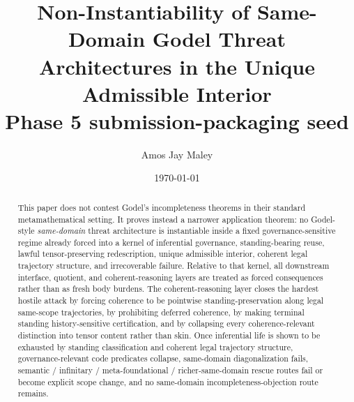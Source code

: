 \documentclass[11pt]{article}
\title{Non-Instantiability of Same-Domain Godel Threat Architectures in the Unique Admissible Interior\\\large Phase 5 submission-packaging seed}
\author{Amos Jay Maley}
\date{\today}
\begin{document}
\maketitle

\begin{abstract}
This paper does not contest Godel's incompleteness theorems in their standard metamathematical setting. It proves instead a narrower application theorem: no Godel-style \emph{same-domain} threat architecture is instantiable inside a fixed governance-sensitive regime already forced into a kernel of inferential governance, standing-bearing reuse, lawful tensor-preserving redescription, unique admissible interior, coherent legal trajectory structure, and irrecoverable failure. Relative to that kernel, all downstream interface, quotient, and coherent-reasoning layers are treated as forced consequences rather than as fresh body burdens. The coherent-reasoning layer closes the hardest hostile attack by forcing coherence to be pointwise standing-preservation along legal same-scope trajectories, by prohibiting deferred coherence, by making terminal standing history-sensitive certification, and by collapsing every coherence-relevant distinction into tensor content rather than skin. Once inferential life is shown to be exhausted by standing classification and coherent legal trajectory structure, governance-relevant code predicates collapse, same-domain diagonalization fails, semantic / infinitary / meta-foundational / richer-same-domain rescue routes fail or become explicit scope change, and no same-domain incompleteness-objection route remains.
\end{abstract}

\tableofcontents







\appendix





\end{document}
